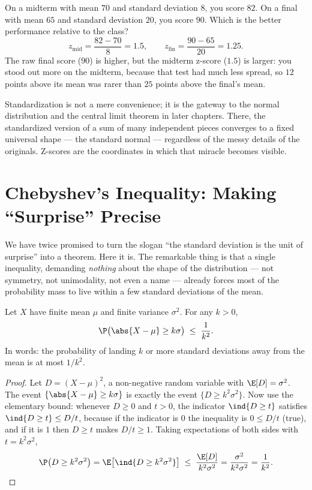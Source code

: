 \begin{example}
\label{ch09:ex-exams}
On a midterm with mean $70$ and standard deviation $8$, you score $82$. On a
final with mean $65$ and standard deviation $20$, you score $90$. Which is the
better performance relative to the class?
\[
  z_{\text{mid}} = \frac{82-70}{8} = 1.5,
  \qquad
  z_{\text{fin}} = \frac{90-65}{20} = 1.25.
\]
The raw final score ($90$) is higher, but the midterm z-score ($1.5$) is
larger: you stood out more on the midterm, because that test had much less
spread, so $12$ points above its mean was rarer than $25$ points above the
final's mean.
\end{example}

Standardization is not a mere convenience; it is the gateway to the normal
distribution and the central limit theorem in later chapters. There, the
standardized version of a sum of many independent pieces converges to a fixed
universal shape --- the standard normal --- regardless of the messy details
of the originals. Z-scores are the coordinates in which that miracle becomes
visible.

\section{Chebyshev's Inequality: Making ``Surprise'' Precise}
\label{ch09:chebyshev}

We have twice promised to turn the slogan ``the standard deviation is the unit
of surprise'' into a theorem. Here it is. The remarkable thing is that a single
inequality, demanding \emph{nothing} about the shape of the distribution ---
not symmetry, not unimodality, not even a name --- already forces most of the
probability mass to live within a few standard deviations of the mean.

\begin{theorem}
\label{ch09:thm-cheby}
Let $X$ have finite mean $\mu$ and finite variance $\sigma^2$. For any
$k > 0$,
\[
  \P\big(\abs{X-\mu} \ge k\sigma\big) \;\le\; \frac{1}{k^2}.
\]
In words: the probability of landing $k$ or more standard deviations away from
the mean is at most $1/k^2$.
\end{theorem}

\begin{proof}
Let $D = (X-\mu)^2$, a non-negative random variable with $\E[D] = \sigma^2$.
The event $\{\abs{X-\mu} \ge k\sigma\}$ is exactly the event
$\{D \ge k^2\sigma^2\}$. Now use the elementary bound: whenever $D \ge 0$ and
$t > 0$, the indicator $\ind\{D \ge t\}$ satisfies
$\ind\{D \ge t\} \le D/t$, because if the indicator is $0$ the inequality is
$0 \le D/t$ (true), and if it is $1$ then $D \ge t$ makes $D/t \ge 1$. Taking
expectations of both sides with $t = k^2\sigma^2$,
\[
  \P\big(D \ge k^2\sigma^2\big) = \E\big[\ind\{D \ge k^2\sigma^2\}\big]
  \;\le\; \frac{\E[D]}{k^2\sigma^2} = \frac{\sigma^2}{k^2\sigma^2}
  = \frac{1}{k^2}. \qedhere
\]
\end{proof}

